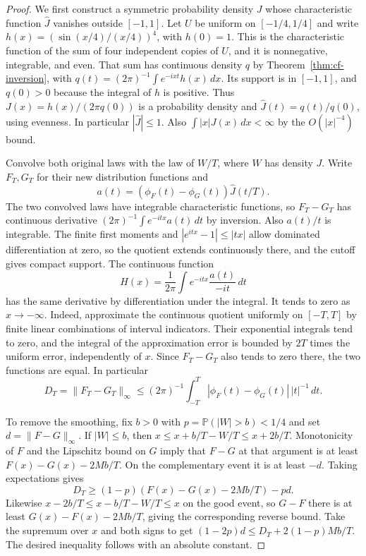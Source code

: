 \documentclass[11pt,oneside,openany]{book}
\newcommand{\Prob}{\mathbb{P}}
\theoremstyle{plain}
\theoremstyle{definition}
\theoremstyle{remark}
\begin{document}
\begin{proof}
We first construct a symmetric probability density \(J\) whose
characteristic function \(\widehat J\) vanishes outside \([-1,1]\).
Let \(U\) be uniform on \([-1/4,1/4]\) and write
\(h(x)=(\sin(x/4)/(x/4))^4\), with \(h(0)=1\).
This is the characteristic function of the sum of four independent
copies of \(U\), and it is nonnegative, integrable, and even.
That sum has continuous density \(q\) by
Theorem~\ref{thm:cf-inversion}, with
\(q(t)=(2\pi)^{-1}\int e^{-ixt}h(x)\,dx\).
Its support is in \([-1,1]\), and \(q(0)>0\) because the integral of
\(h\) is positive. Thus
\(J(x)=h(x)/(2\pi q(0))\) is a probability density and
\(\widehat J(t)=q(t)/q(0)\), using evenness.
In particular \(|\widehat J|\le1\).
Also \(\int|x|J(x)\,dx<\infty\) by the \(O(|x|^{-4})\) bound.

Convolve both original laws with the law of \(W/T\), where \(W\)
has density \(J\). Write \(F_T,G_T\) for their new distribution
functions and
\[
 a(t)=(\phi_F(t)-\phi_G(t))\widehat J(t/T).
\]
The two convolved laws have integrable characteristic functions, so
\(F_T-G_T\) has continuous derivative
\((2\pi)^{-1}\int e^{-itx}a(t)\,dt\) by inversion.
Also \(a(t)/t\) is integrable. The finite first moments and
\(|e^{itx}-1|\le|tx|\) allow dominated differentiation at zero,
so the quotient extends continuously there, and the cutoff
gives compact support. The continuous function
\[
 H(x)=\frac1{2\pi}\int e^{-itx}\frac{a(t)}{-it}\,dt
\]
has the same derivative by differentiation under the integral.
It tends to zero as \(x\to-\infty\). Indeed, approximate the
continuous quotient uniformly on \([-T,T]\) by finite linear
combinations of interval indicators. Their exponential integrals
tend to zero, and the integral of the approximation error is
bounded by \(2T\) times the uniform error, independently of \(x\).
Since \(F_T-G_T\) also tends to zero there, the two functions are equal.
In particular
\[
 D_T=\|F_T-G_T\|_\infty
 \le (2\pi)^{-1}\int_{-T}^T
            |\phi_F(t)-\phi_G(t)|\,|t|^{-1}\,dt .
\]

To remove the smoothing, fix \(b>0\) with
\(p=\Prob(|W|>b)<1/4\) and set \(d=\|F-G\|_\infty\).
If \(|W|\le b\), then \(x\le x+b/T-W/T\le x+2b/T\).
Monotonicity of \(F\) and the Lipschitz bound on \(G\) imply that
\(F-G\) at that argument is at least \(F(x)-G(x)-2Mb/T\).
On the complementary event it is at least \(-d\).
Taking expectations gives
\[
 D_T\ge (1-p)(F(x)-G(x)-2Mb/T)-pd .
\]
Likewise \(x-2b/T\le x-b/T-W/T\le x\) on the good event,
so \(G-F\) there is at least \(G(x)-F(x)-2Mb/T\), giving
the corresponding reverse bound. Take the supremum over \(x\) and
both signs to get
\((1-2p)d\le D_T+2(1-p)Mb/T\).
The desired inequality follows with an absolute constant.
\end{proof}
\end{document}
